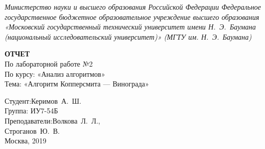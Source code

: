 \begin{titlepage}
	\centering

	{\footnotesize\itshape Министерство науки и высшего образования
	Российской Федерации Федеральное государственное бюджетное
	образовательное учреждение высшего образования «Московский
	государственный технический университет имени Н.~Э.~Баумана
	(национальный исследовательский университет)» (МГТУ им. Н.~Э.~Баумана)
	\\}

	\vspace{60mm}

	\textbf{ОТЧЕТ}\\
	По лабораторной работе №2\\
	По курсу: «Анализ алгоритмов»\\
	Тема: «Алгоритм Копперсмита — Винограда»\\

	\vspace{60mm}

	\hspace{70mm} Студент:\hfill Керимов~А.~Ш.\\
	\hspace{70mm} Группа: \hfill ИУ7-54Б\\
	\hspace{70mm} Преподаватели:\hfill Волкова~Л.~Л.,\\
	                            \hfill Строганов~Ю.~В.\\

	\vfill
	Москва, 2019
\end{titlepage}
